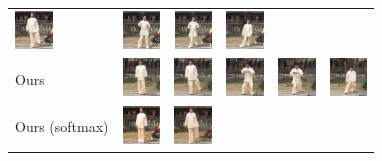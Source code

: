 \documentclass{article}
\begin{document}
\begin{table}[t]
\begin{center}
\begin{small}
\begin{sc}
\begin{tabular}{m{1.0cm}m{1.0cm}m{1.0cm}m{1.0cm}m{1.0cm}m{1.0cm}}
\includegraphics[width=1cm, height=1cm]{images/intro_image/animate_2_fomm.png} &
\includegraphics[width=1cm, height=1cm]{images/intro_image/animate_4_fomm.png} &
\includegraphics[width=1cm, height=1cm]{images/intro_image/animate_5_fomm.png} &
\includegraphics[width=1cm, height=1cm]{images/intro_image/animate_6_fomm.png} \\
Ours & \includegraphics[width=1cm, height=1cm]{images/intro_image/animate_1.png} &
\includegraphics[width=1cm, height=1cm]{images/intro_image/animate_2.png} &
\includegraphics[width=1cm, height=1cm]{images/intro_image/animate_4.png} &
\includegraphics[width=1cm, height=1cm]{images/intro_image/animate_5.png} &
\includegraphics[width=1cm, height=1cm]{images/intro_image/animate_6.png} \\
Ours (softmax)&
\includegraphics[width=1cm, height=1cm]{images/softmax/01.png} &
\includegraphics[width=1cm, height=1cm]{images/softmax/02.png} &

\end{tabular}
\end{sc}
\end{small}
\end{center}
\end{table}
\end{document}
